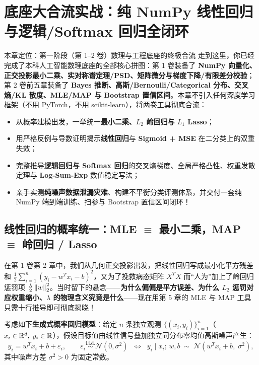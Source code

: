 \chapter[纯 NumPy 回归/分类端到端闭环]{底座大合流实战：纯 NumPy 线性回归与逻辑/Softmax 回归全闭环}
\label{ch:ch6-logreg-pipeline}


\begin{chapIntro}{本章定位：第一阶段（第 1--2 卷）数理与工程底座的终极合流}
走到这里，你已经完成了本科人工智能数理底座的全部核心拼图：第 1 卷装备了 \textbf{NumPy 向量化、正交投影最小二乘、实对称谱定理/PSD、矩阵微分与梯度下降/有限差分校验}；第 2 卷前五章装备了 \textbf{Bayes 推断、高斯/Bernoulli/Categorical 分布、交叉熵/KL 散度、MLE/MAP 与 Bootstrap 置信区间}。本章不引入任何深度学习框架（不用 PyTorch，不用 scikit-learn），将两卷工具彻底合流：
\begin{itemize}
  \item 从概率建模出发，一举统一\textbf{最小二乘、$L_2$ 岭回归与 $L_1$ Lasso}；
  \item 用严格反例与导数证明揭示\textbf{线性回归}与 \textbf{Sigmoid + MSE} 在二分类上的双重失效；
  \item 完整推导\textbf{逻辑回归与 Softmax 回归}的交叉熵梯度、全局严格凸性、权重发散定理与 \textbf{Log-Sum-Exp} 数值稳定写法；
  \item 亲手实测\textbf{纯噪声数据泄漏灾难}、构建不平衡分类评测体系，并交付一套纯 NumPy 端到端训练、扫参与 Bootstrap 置信区间闭环！
\end{itemize}
\end{chapIntro}

\section{线性回归的概率统一：MLE $\equiv$ 最小二乘，MAP $\equiv$ 岭回归 / Lasso}
\label{sec:ch6-linreg-prob}

在第 1 卷第 2 章中，我们从几何正交投影出发，把线性回归写成最小化平方残差和 $\frac{1}{2}\sum_{i=1}^n (y_i - w^T x_i - b)^2$，又为了挽救病态矩阵 $X^T X$ 而“人为”加上了岭回归惩罚项 $\frac{\lambda}{2}\left\|w\right\|_2^2$。当时留下的悬念——\textbf{为什么偏偏是平方误差、为什么 $L_2$ 惩罚对应权重缩小、$\lambda$ 的物理含义究竟是什么}——现在用第 5 章的 MLE 与 MAP 工具只需十行推导即可彻底揭晓！

考虑如下\textbf{生成式概率回归模型}：给定 $n$ 条独立观测 $\{(x_i, y_i)\}_{i=1}^n$（$x_i \in \mathbb{R}^d,\; y_i \in \mathbb{R}$），假设目标值由线性信号叠加独立同分布零均值高斯噪声产生：
\begin{equation}
  y_i = w^T x_i + b + \varepsilon_i,
  \qquad
  \varepsilon_i \stackrel{\text{i.i.d.}}{\sim} \mathcal{N}(0, \sigma^2)
  \;\;\Longleftrightarrow\;\;
  y_i \mid x_i;\, w, b \;\sim\; \mathcal{N}(w^T x_i + b,\; \sigma^2),
  \label{eq:ch6-gauss-noise}
\end{equation}
其中噪声方差 $\sigma^2 > 0$ 为固定常数。

